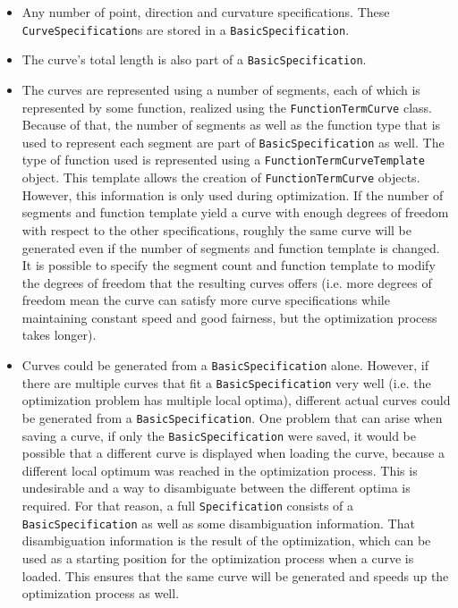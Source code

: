\documentclass[a4paper]{article}
\begin{document}
					\begin{itemize}
						\item Any number of point, direction and curvature specifications. These \verb|CurveSpecification|s are stored in a \verb|BasicSpecification|.
						\item The curve's total length is also part of a \verb|BasicSpecification|.
						\item The curves are represented using a number of segments, each of which is represented by some function, realized using the \verb|FunctionTermCurve| class. Because of that, the number of segments as well as the function type that is used to represent each segment are part of \verb|BasicSpecification| as well. 
						The type of function used is represented using a \verb|FunctionTermCurveTemplate| object. This template allows the creation of \verb|FunctionTermCurve| objects.  
						However, this information is only used during optimization. If the number of segments and function template yield a curve with enough degrees of freedom with respect to the other specifications, roughly the same curve will be generated even if the number of segments and function template is changed. It is possible to specify the segment count and function template to modify the degrees of freedom that the resulting curves offers (i.e. more degrees of freedom mean the curve can satisfy more curve specifications while maintaining constant speed and good fairness, but the optimization process takes longer).
						\item Curves could be generated from a \verb|BasicSpecification| alone. However, if there are multiple curves that fit a \verb|BasicSpecification| very well (i.e. the optimization problem has multiple local optima), different actual curves could be generated from a \verb|BasicSpecification|. One problem that can arise when saving a curve, if only the \verb|BasicSpecification| were saved, it would be possible that a different curve is displayed when loading the curve, because a different local optimum was reached in the optimization process. This is undesirable and a way to disambiguate between the different optima is required. 
						For that reason, a full \verb|Specification| consists of a \verb|BasicSpecification| as well as some disambiguation information. That disambiguation information is the result of the optimization, which can be used as a starting position for the optimization process when a curve is loaded. This ensures that the same curve will be generated and speeds up the optimization process as well.
					\end{itemize}
				
\end{document}
